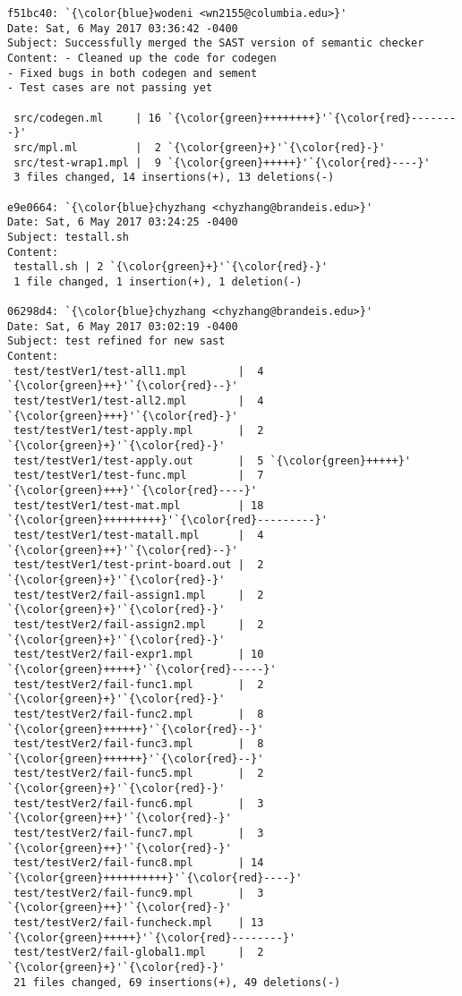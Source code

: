\begin{lstlisting}
f51bc40: `{\color{blue}wodeni <wn2155@columbia.edu>}'
Date: Sat, 6 May 2017 03:36:42 -0400
Subject: Successfully merged the SAST version of semantic checker
Content: - Cleaned up the code for codegen
- Fixed bugs in both codegen and sement
- Test cases are not passing yet

 src/codegen.ml     | 16 `{\color{green}++++++++}'`{\color{red}--------}'
 src/mpl.ml         |  2 `{\color{green}+}'`{\color{red}-}'
 src/test-wrap1.mpl |  9 `{\color{green}+++++}'`{\color{red}----}'
 3 files changed, 14 insertions(+), 13 deletions(-)

e9e0664: `{\color{blue}chyzhang <chyzhang@brandeis.edu>}'
Date: Sat, 6 May 2017 03:24:25 -0400
Subject: testall.sh
Content: 
 testall.sh | 2 `{\color{green}+}'`{\color{red}-}'
 1 file changed, 1 insertion(+), 1 deletion(-)

06298d4: `{\color{blue}chyzhang <chyzhang@brandeis.edu>}'
Date: Sat, 6 May 2017 03:02:19 -0400
Subject: test refined for new sast
Content: 
 test/testVer1/test-all1.mpl        |  4 `{\color{green}++}'`{\color{red}--}'
 test/testVer1/test-all2.mpl        |  4 `{\color{green}+++}'`{\color{red}-}'
 test/testVer1/test-apply.mpl       |  2 `{\color{green}+}'`{\color{red}-}'
 test/testVer1/test-apply.out       |  5 `{\color{green}+++++}'
 test/testVer1/test-func.mpl        |  7 `{\color{green}+++}'`{\color{red}----}'
 test/testVer1/test-mat.mpl         | 18 `{\color{green}+++++++++}'`{\color{red}---------}'
 test/testVer1/test-matall.mpl      |  4 `{\color{green}++}'`{\color{red}--}'
 test/testVer1/test-print-board.out |  2 `{\color{green}+}'`{\color{red}-}'
 test/testVer2/fail-assign1.mpl     |  2 `{\color{green}+}'`{\color{red}-}'
 test/testVer2/fail-assign2.mpl     |  2 `{\color{green}+}'`{\color{red}-}'
 test/testVer2/fail-expr1.mpl       | 10 `{\color{green}+++++}'`{\color{red}-----}'
 test/testVer2/fail-func1.mpl       |  2 `{\color{green}+}'`{\color{red}-}'
 test/testVer2/fail-func2.mpl       |  8 `{\color{green}++++++}'`{\color{red}--}'
 test/testVer2/fail-func3.mpl       |  8 `{\color{green}++++++}'`{\color{red}--}'
 test/testVer2/fail-func5.mpl       |  2 `{\color{green}+}'`{\color{red}-}'
 test/testVer2/fail-func6.mpl       |  3 `{\color{green}++}'`{\color{red}-}'
 test/testVer2/fail-func7.mpl       |  3 `{\color{green}++}'`{\color{red}-}'
 test/testVer2/fail-func8.mpl       | 14 `{\color{green}++++++++++}'`{\color{red}----}'
 test/testVer2/fail-func9.mpl       |  3 `{\color{green}++}'`{\color{red}-}'
 test/testVer2/fail-funcheck.mpl    | 13 `{\color{green}+++++}'`{\color{red}--------}'
 test/testVer2/fail-global1.mpl     |  2 `{\color{green}+}'`{\color{red}-}'
 21 files changed, 69 insertions(+), 49 deletions(-)


\end{lstlisting}
